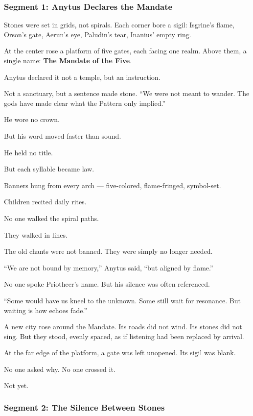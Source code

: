 \documentclass[9pt]{article}
\begin{document}
\newpage

\subsubsection*{Segment 1: Anytus Declares the Mandate}

Stones were set in grids, not spirals.  
Each corner bore a sigil:  
Isgrine’s flame, Orson’s gate, Aerun’s eye, Paludin’s tear, Inanius’ empty ring.

At the center rose a platform of five gates, each facing one realm.  
Above them, a single name: \textbf{The Mandate of the Five}.

Anytus declared it not a temple, but an instruction.  

Not a sanctuary, but a sentence made stone.  
 “We were not meant to wander.  
 The gods have made clear what the Pattern only implied.”

He wore no crown.  

But his word moved faster than sound.  

He held no title.  

But each syllable became law.

Banners hung from every arch — five-colored, flame-fringed, symbol-set.  

Children recited daily rites.  

No one walked the spiral paths.  

They walked in lines.

The old chants were not banned.  
They were simply no longer needed.

 “We are not bound by memory,” Anytus said,  
 “but aligned by flame.”

No one spoke Priotheer’s name.  
But his silence was often referenced.

 “Some would have us kneel to the unknown.  
 Some still wait for resonance.  
 But waiting is how echoes fade.”

A new city rose around the Mandate.  
Its roads did not wind.  
Its stones did not sing.  
But they stood, evenly spaced, as if listening had been replaced by arrival.

At the far edge of the platform, a gate was left unopened.  
Its sigil was blank.

No one asked why.  
No one crossed it.

Not yet.


\newpage

\subsubsection*{Segment 2: The Silence Between Stones}
\end{document}

